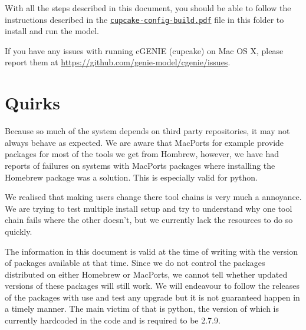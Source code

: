 \documentclass{scrartcl}
\begin{document}
With all the steps described in this document, you should be able to follow the
instructions described in the
\href{run:./cupcake-config-build.pdf}{\texttt{cupcake-config-build.pdf}} file in this
folder to install and run the model.

If you have any issues with running cGENIE (cupcake) on Mac OS X, please report them at
\url{https://github.com/genie-model/cgenie/issues}.

\section{Quirks}

Because so much of the system depends on third party repositories, it may not
always behave as expected. We are aware that MacPorts for example provide
packages for most of the tools we get from Hombrew, however, we have had
reports of failures on systems with MacPorts packages where installing the
Homebrew package was a solution. This is especially valid for python.

We realised that making users change there tool chains is very much a
annoyance. We are trying to test multiple install setup and try to understand
why one tool chain fails where the other doesn't, but we currently lack the
resources to do so quickly.

The information in this document is valid at the time of writing with the
version of packages available at that time. Since we do not control the
packages distributed on either Homebrew or MacPorts, we cannot tell whether
updated versions of these packages will still work. We will endeavour to follow
the releases of the packages with use and test any upgrade but it is not
guaranteed happen in a timely manner. The main victim of that is python, the
version of which is currently hardcoded in the code and is required to be
2.7.9.
\end{document}
